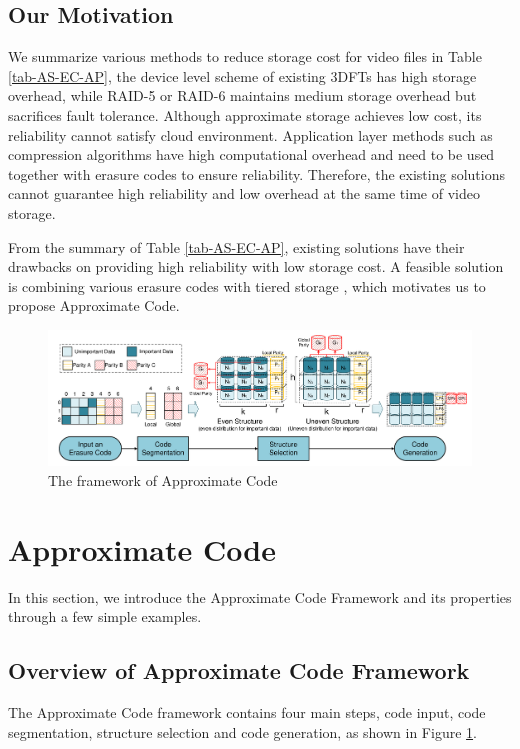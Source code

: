 \documentclass[sigconf]{acmart}
\begin{document}
\subsection{Our Motivation}
We summarize various methods to reduce storage cost for video files in Table \ref{tab-AS-EC-AP}, the device level scheme of existing 3DFTs has high storage overhead, while RAID-5 or RAID-6 maintains medium storage overhead but sacrifices fault tolerance. Although approximate storage achieves low cost, its reliability cannot satisfy cloud environment. Application layer methods such as compression algorithms have high computational overhead and need to be used together with erasure codes to ensure reliability.
Therefore, the existing solutions cannot guarantee high reliability and low overhead at the same time of video storage.

From the summary of Table \ref{tab-AS-EC-AP}, existing solutions have their drawbacks on providing high reliability with low storage cost. 
A feasible solution is combining various erasure codes with tiered storage \cite{krish2014hats} \cite{wang2014balancing} \cite{zhang2010automated} \cite{udipi2012lot}, which motivates us to propose Approximate Code.

\begin{figure}[ht!]
\centering
\includegraphics[width=0.8\linewidth]{photo/Framework-v3.pdf}
\caption{The framework of Approximate Code}\label{fig-framework}
\vspace{-2mm}
\end{figure}

\section{Approximate Code}\label{ApCode}
In this section, we introduce the Approximate Code Framework and its properties through a few simple examples.

\subsection{Overview of Approximate Code Framework}
The Approximate Code framework contains four main steps, code input, code segmentation, structure selection and code generation, as shown in Figure \ref{fig-framework}.
\end{document}
